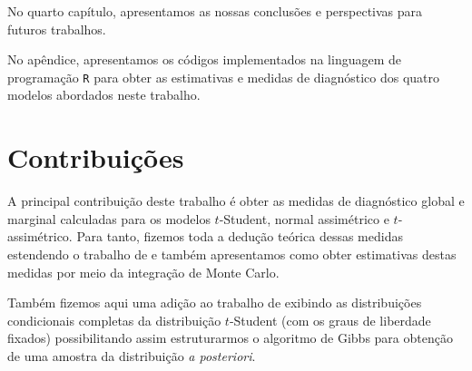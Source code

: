 No quarto capítulo, apresentamos as nossas conclusões e perspectivas para futuros trabalhos.

No apêndice, apresentamos os códigos implementados na linguagem de programação \texttt{R} para obter as estimativas e medidas de diagnóstico dos quatro modelos abordados neste trabalho.
\section{Contribuições}
\label{sec:contribucoes}

A principal contribuição deste trabalho é obter as medidas de diagnóstico global e marginal calculadas para os modelos $t$-Student, normal assimétrico e $t$-assimétrico. Para tanto, fizemos toda a dedução teórica dessas medidas estendendo o trabalho de \citet{WeissCho1998} e também apresentamos como obter estimativas destas medidas por meio da integração de Monte Carlo. 

Também fizemos aqui uma adição ao trabalho de \citet{Godoi2007:MSc} exibindo as distribuições condicionais completas da distribuição $t$-Student (com os graus de liberdade fixados) possibilitando assim estruturarmos o algoritmo de Gibbs para obtenção de uma amostra da distribuição \textit{a posteriori}.

